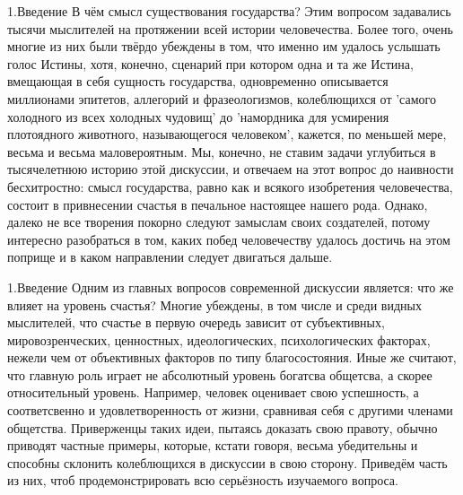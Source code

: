 \documentclass[aspectratio=169]{beamer}
\title{}
\subtitle{Влияние макроэкономических показателей страны на уровень индивидуального благополучия граждан}
\author{Заостровский Всеволод, Сулейманов Асхаб, Черепахин Иван}
\institute{Vega Institute Foundation, Мехмат МГУ}
\date{}
\begin{document}
\maketitle

    

    

\begin{frame}{1.Введение}
   В чём смысл существования государства? Этим вопросом задавались тысячи мыслителей на протяжении всей истории человечества. Более того, очень многие из них были твёрдо убеждены в том, что именно им удалось услышать голос Истины, хотя, конечно, сценарий при котором одна и та же Истина, вмещающая в себя сущность государства, одновременно описывается миллионами эпитетов, аллегорий и фразеологизмов, колеблющихся от ’самого холодного из всех холодных чудовищ’ до ’намордника для усмирения плотоядного животного, называющегося человеком’, кажется, по меньшей мере, весьма и весьма маловероятным. Мы, конечно, не ставим задачи углубиться в тысячелетнюю историю этой дискуссии, и отвечаем на этот вопрос до наивности бесхитростно: смысл государства, равно как и всякого изобретения человечества, состоит в привнесении счастья в печальное настоящее нашего рода. 
\hfill \break
\hfill \break
   Однако, далеко не все творения покорно следуют замыслам своих создателей, потому интересно разобраться в том, каких побед человечеству удалось достичь на этом поприще и в каком направлении следует двигаться дальше.
     
 \end{frame}

\begin{frame}{1.Введение}
   Одним из главных вопросов современной дискуссии является: что же влияет на уровень счастья? Многие убеждены, в том числе и среди видных мыслителей, что счастье в первую очередь зависит от субъективных, мировозренческих, ценностных, идеологических, психологических факторах, нежели чем от объективных факторов по типу благосостояния. Иные же считают, что главную роль играет не абсолютный уровень богатсва общетсва, а скорее относительный уровень. Например, человек оценивает свою успешность, а соответсвенно и удовлетворенность от жизни, сравнивая себя с другими членами общетства. Приверженцы таких идеи, пытаясь доказать свою правоту, обычно приводят частные примеры, которые, кстати говоря, весьма убедительны и способны склонить колеблющихся в дискуссии в свою сторону. Приведём часть из них, чтоб продемонстрировать всю серьёзность изучаемого вопроса. 
\end{frame}
\end{document}
